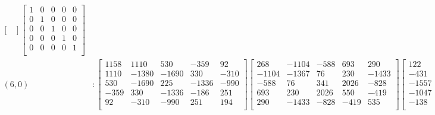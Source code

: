 \documentclass[12pt]{amsart}
\theoremstyle{plain}
\theoremstyle{definition}
\begin{document}
\begin{landscape}
\begin{align*}
\begin{bmatrix}
\end{bmatrix}
\begin{bmatrix}
1  &   0  &   0  &   0  &   0  \\ 
 0  &   1  &   0  &   0  &   0  \\ 
 0  &   0  &   1  &   0  &   0  \\ 
 0  &   0  &   0  &   1  &   0  \\ 
 0  &   0  &   0  &   0  &   1  \\ 
\end{bmatrix}
\\
(6,0) &:
\begin{bmatrix}
1158  &   1110  &   530  &   -359  &   92  \\ 
 1110  &   -1380  &   -1690  &   330  &   -310  \\ 
 530  &   -1690  &   225  &   -1336  &   -990  \\ 
 -359  &   330  &   -1336  &   -186  &   251  \\ 
 92  &   -310  &   -990  &   251  &   194  \\ 
\end{bmatrix}
\begin{bmatrix}
268  &   -1104  &   -588  &   693  &   290  \\ 
 -1104  &   -1367  &   76  &   230  &   -1433  \\ 
 -588  &   76  &   341  &   2026  &   -828  \\ 
 693  &   230  &   2026  &   550  &   -419  \\ 
 290  &   -1433  &   -828  &   -419  &   535  \\ 
\end{bmatrix}
\begin{bmatrix}
122  &   -431  &   -1557  &   -1047  &   -138  \\ 
 -431  &   -1618  &   -677  &   383  &   -173  \\ 
 -1557  &   -677  &   71  &   143  &   417  \\ 
 -1047  &   383  &   143  &   -194  &   -280  \\ 
 -138  &   -173  &   417  &   -280  &   633  \\ 
\end{bmatrix}
\begin{bmatrix}
1  &   0  &   0  &   0  &   0  \\ 
 0  &   1  &   0  &   0  &   0  \\ 
 0  &   0  &   1  &   0  &   0  \\ 
 0  &   0  &   0  &   1  &   0  \\ 

\end{bmatrix}
\end{align*}
\end{landscape}
\end{document}
